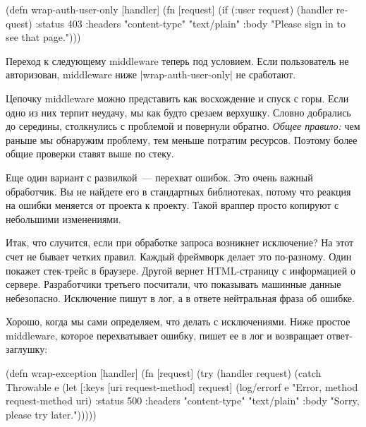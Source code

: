 \begin{english}
  \begin{clojure}
(defn wrap-auth-user-only [handler]
  (fn [request]
    (if (:user request)
      (handler request)
      {:status 403
       :headers {"content-type" "text/plain"}
       :body "Please sign in to see that page."})))
  \end{clojure}
\end{english}

Переход к следующему middleware теперь под условием. Если пользователь не
авторизован, middleware ниже \spverb|wrap-auth-user-only| не сработают.

Цепочку middleware можно представить как восхождение и спуск с горы. Если одно
из них терпит неудачу, мы как будто срезаем верхушку. Словно добрались до
середины, столкнулись с проблемой и повернули обратно. \emph{Общее правило:} чем
раньше мы обнаружим проблему, тем меньше потратим ресурсов. Поэтому более общие
проверки ставят выше по стеку.

Еще один вариант с развилкой~--- перехват ошибок. Это очень важный
обработчик. Вы не найдете его в стандартных библиотеках, потому что реакция на
ошибки меняется от проекта к проекту. Такой враппер просто копируют с небольшими
изменениями.

Итак, что случится, если при обработке запроса возникнет исключение? На этот
счет не бывает четких правил. Каждый фреймворк делает это по-разному. Один
покажет стек-трейс в браузере. Другой вернет HTML-страницу с информацией о
сервере. Разработчики третьего посчитали, что показывать машинные данные
небезопасно. Исключение пишут в лог, а в ответе нейтральная фраза об ошибке.

Хорошо, когда мы сами определяем, что делать с исключениями. Ниже простое
middleware, которое перехватывает ошибку, пишет ее в лог и возвращает
ответ-заглушку:

\begin{english}
  \begin{clojure}
(defn wrap-exception [handler]
  (fn [request]
    (try
      (handler request)
      (catch Throwable e
        (let [{:keys [uri
                      request-method]} request]
          (log/errorf e "Error, method %
                      request-method uri)
          {:status 500
           :headers {"content-type" "text/plain"}
           :body "Sorry, please try later."})))))
  \end{clojure}
\end{english}

